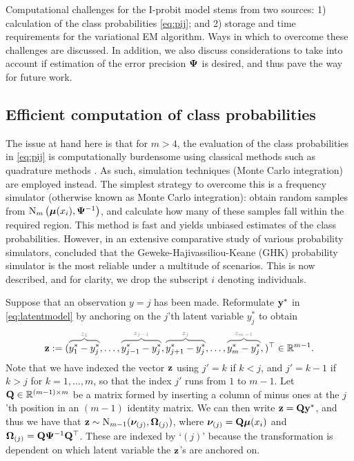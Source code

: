 Computational challenges for the I-probit model stems from two sources: 1) calculation of the class probabilities \cref{eq:pij}; and 2) storage and time requirements for the variational EM algorithm.
Ways in which to overcome these challenges are discussed.
In addition, we also discuss considerations to take into account if estimation of the error precision ${\bm\Psi}$ is desired, and thus pave the way for future work.

\subsection{Efficient computation of class probabilities}
\label{sec:mnint}

The issue at hand here is that for $m>4$, the evaluation of the class probabilities in \cref{eq:pij} is computationally burdensome using classical methods such as quadrature methods \citet{geweke1994alternative}.
As such, simulation techniques (Monte Carlo integration) are employed instead.
The simplest strategy to overcome this is a frequency simulator (otherwise known as Monte Carlo integration): obtain random samples from $\operatorname{N}_{m}\big({\bm\mu}(x_i), {\bm\Psi}^{-1}\big)$, and calculate how many of these samples fall within the required  region.
This method is fast and yields unbiased estimates of the class probabilities.
However, in an extensive comparative study of various probability simulators, \citet{hajivassiliou1996simulation} concluded that the Geweke-Hajivassiliou-Keane (GHK) probability simulator \citep{geweke1989bayesian,hajivassiliou1998method,keane1994solution} is the most reliable under a multitude of scenarios.
This is now described, and for clarity, we drop the subscript $i$ denoting individuals. 

Suppose that an observation $y=j$ has been made.
Reformulate ${\mathbf y}^*$ in \cref{eq:latentmodel} by anchoring on the $j$'th latent variable $y_j^*$ to obtain
\[
  \bz := (
  \greyoverbrace{y_1^* - y_j^*}{ z_1},
  \dots,
  \greyoverbrace{y_{j-1}^* - y_j^*}{ z_{j-1}},
  \greyoverbrace{y_{j+1}^* - y_j^*}{ z_{j}},
  \dots, 
  \greyoverbrace{y_m^* - y_j^*}{ z_{m-1}},
  )^\top \in \bbR^{m-1}.
\]
Note that we have indexed the vector ${\mathbf z}$ using $j' = k$ if $k < j$, and $j' = k -1$ if $k > j$ for $k=1,\dots,m$, so that the index $j'$ runs from $1$ to $m-1$.
Let ${\mathbf Q} \in \mathbb{R}^{(m-1)\times m}$ be a matrix formed by inserting a column of minus ones at the $j$'th position in an $(m-1)$ identity matrix.
We can then write ${\mathbf z} = {\mathbf Q}{\mathbf y}^*$, and thus we have that ${\mathbf z}\sim\operatorname{N}_{m-1}({\bm\nu}_{(j)}, {\bm\Omega}_{(j)})$, where ${\bm\nu}_{(j)} = {\mathbf Q}{\bm\mu}(x_i)$ and ${\bm\Omega}_{(j)} = {\mathbf Q}{\bm\Psi}^{-1}{\mathbf Q}^\top$.
These are indexed by `$(j)$' because the transformation is dependent on which latent variable the ${\mathbf z}$'s are anchored on.

